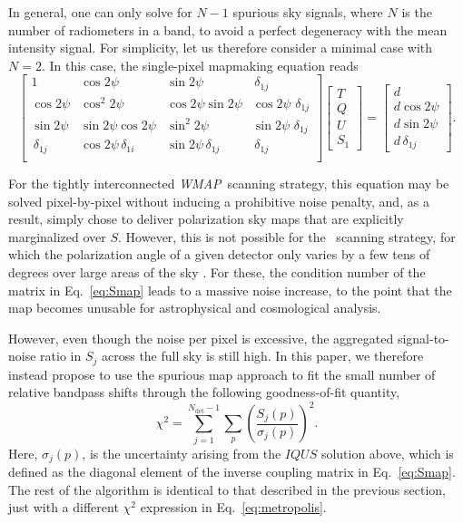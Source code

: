 \documentclass[twocolumn]{aa}
\def\WMAP{\textit{WMAP}}
\newcommand{\?}[1]{\textcolor{red}{{\bf [#1]}}}
\begin{document}
In general, one can only solve for $N-1$ spurious sky signals, where
$N$ is the number of radiometers in a band, to avoid a perfect
degeneracy with the mean intensity signal. For simplicity, let us
therefore consider a minimal case with $N=2$. In this case, the
single-pixel mapmaking equation reads
{\fontsize{7}{4}\selectfont
\begin{equation}
    \left[\begin{array}{cccc}
        1 & \cos 2\psi & \sin 2\psi & \,\delta_{1j} \\
        \cos 2\psi & \cos^2 2\psi & \cos 2\psi \sin 2\psi & \cos 2\psi\,
        \,\delta_{1j} \\
        \sin 2\psi & \sin 2\psi\cos 2\psi & \sin^2 2\psi & \sin 2\psi\,
        \,\delta_{1j} \\
        \,\delta_{1j} & \cos 2\psi\,\delta_{1i} & \sin 2\psi\,\delta_{1j} & \,\delta_{1j} \\
    \end{array}\right]
    \left[\begin{array}{c}
        T \\ Q \\ U \\ S_1
    \end{array}\right]
    =
    \left[\begin{array}{c}
        d \\ d\cos 2\psi  \\ d\sin 2\psi  \\ d\,\delta_{1j}
    \end{array}\right].
    \label{eq:Smap}
\end{equation}
}\normalfont

For the tightly interconnected \WMAP\ scanning strategy, this
equation may be solved pixel-by-pixel without inducing a prohibitive
noise penalty, and, as a result, \citet{page2007} simply chose to
deliver polarization sky maps that are explicitly marginalized over
$S$. However, this is not possible for the \Planck\ scanning strategy,
for which the polarization angle of a given detector only varies by a
few tens of degrees over large areas of the sky
\citep{planck2013-p01}. For these, the condition number of the matrix
in Eq.~\eqref{eq:Smap} leads to a massive noise increase, to the point
that the map becomes unusable for astrophysical and cosmological
analysis.


However, even though the noise per pixel is excessive, the aggregated
signal-to-noise ratio in $S_j$ across the full sky is still high. In this
paper, we therefore instead propose to use the spurious map approach
to fit the small number of relative bandpass shifts through the
following goodness-of-fit quantity,
\begin{equation}
  \chi^2 = \sum_{j=1}^{N_{\mathrm{det}}-1} \sum_p \left(\frac{S_j(p)}{\sigma_{j}(p)}\right)^2.
\end{equation}
Here, $\sigma_j(p)$, is the uncertainty arising from the $IQUS$
solution above, which is defined as the diagonal element of the
inverse coupling matrix in Eq.~\eqref{eq:Smap}. The rest of the
algorithm is identical to that described in the previous section, just
with a different $\chi^2$ expression in Eq.~\eqref{eq:metropolis}.
\end{document}
